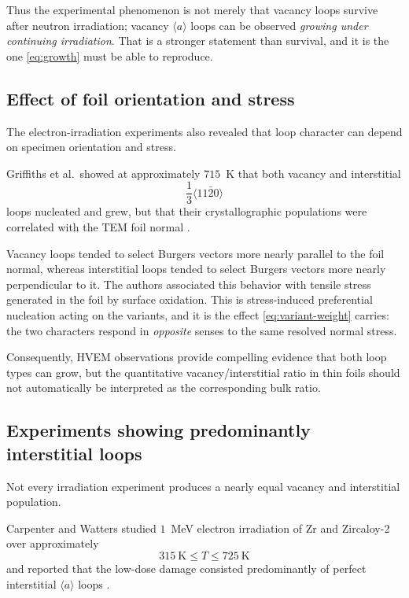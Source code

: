 \documentclass{article}
\newcommand{\aloop}{\ensuremath{\langle a\rangle}}
\begin{document}
Thus the experimental phenomenon is not merely that vacancy loops survive after
neutron irradiation; vacancy \aloop{} loops can be observed \emph{growing under
continuing irradiation}. That is a stronger statement than survival, and it is
the one \cref{eq:growth} must be able to reproduce.

\subsection{Effect of foil orientation and stress}

The electron-irradiation experiments also revealed that loop character can
depend on specimen orientation and stress.

Griffiths et al.\ showed at approximately $715$~K that both vacancy and
interstitial
\begin{equation}
    \frac13\langle11\bar20\rangle
\end{equation}
loops nucleated and grew, but that their crystallographic populations were
correlated with the TEM foil normal \citep{griffiths1984anisotropic}.

Vacancy loops tended to select Burgers vectors more nearly parallel to the foil
normal, whereas interstitial loops tended to select Burgers vectors more nearly
perpendicular to it. The authors associated this behavior with tensile stress
generated in the foil by surface oxidation. This is stress-induced preferential
nucleation acting on the variants, and it is the effect \cref{eq:variant-weight}
carries: the two characters respond in \emph{opposite} senses to the same
resolved normal stress.

Consequently, HVEM observations provide compelling evidence that both loop types
can grow, but the quantitative vacancy/interstitial ratio in thin foils should
not automatically be interpreted as the corresponding bulk ratio.

\subsection{Experiments showing predominantly interstitial loops}

Not every irradiation experiment produces a nearly equal vacancy and
interstitial population.

Carpenter and Watters studied $1$~MeV electron irradiation of Zr and Zircaloy-2
over approximately
\begin{equation}
    315~\mathrm K
    \leq T
    \leq
    725~\mathrm K
\end{equation}
and reported that the low-dose damage consisted predominantly of perfect
interstitial \aloop{} loops \citep{carpenter1981study}.
\end{document}
